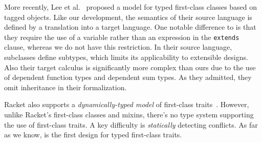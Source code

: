 More recently, Lee et al.~\cite{DBLP:conf/ecoop/LeeASP15} proposed a model for typed first-class
classes based on tagged objects. Like our development, the semantics
of their source language is defined by a translation into a target language.
One notable difference to \name is that they require the use of a variable
rather than an expression in the \lstinline{extends} clause, whereas we do not
have this restriction. In their source language, subclasses define subtypes,
which limits its applicability to extensible designs. Also their target calculus is significantly more complex
than ours due to the use of dependent function types and dependent sum types. As
they admitted, they omit inheritance in their formalization.

Racket also supports a \emph{dynamically-typed model} of first-class
traits~\cite{DBLP:conf/aplas/FlattFF06}. However, unlike Racket's first-class classes and
mixins, there's no type system supporting the use of first-class
traits. A key difficulty is \emph{statically} detecting conflicts.
As far as we know, \name is the first design for typed first-class traits.





